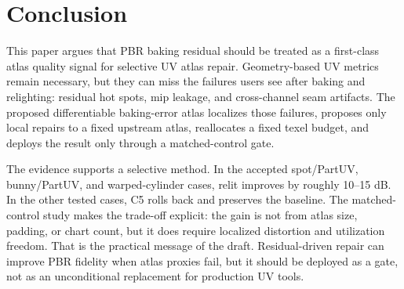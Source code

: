 \section{Conclusion}
\label{sec:conclusion}

This paper argues that PBR baking residual should be treated as a first-class atlas quality signal for selective UV atlas repair. Geometry-based UV metrics remain necessary, but they can miss the failures users see after baking and relighting: residual hot spots, mip leakage, and cross-channel seam artifacts. The proposed differentiable baking-error atlas localizes those failures, proposes only local repairs to a fixed upstream atlas, reallocates a fixed texel budget, and deploys the result only through a matched-control gate.

The evidence supports a selective method. In the accepted spot/PartUV, bunny/PartUV, and warped-cylinder cases, relit \PSNR{} improves by roughly 10--15 dB. In the other tested cases, C5 rolls back and preserves the baseline. The matched-control study makes the trade-off explicit: the gain is not from atlas size, padding, or chart count, but it does require localized distortion and utilization freedom. That is the practical message of the draft. Residual-driven repair can improve PBR fidelity when atlas proxies fail, but it should be deployed as a gate, not as an unconditional replacement for production UV tools.

